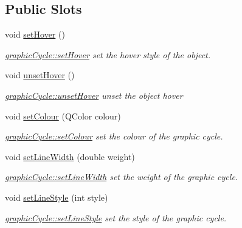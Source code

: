 \subsection*{Public Slots}
\begin{DoxyCompactItemize}
\item 
void \mbox{\hyperlink{classgraphic_cycle_a54708026fc7ea647f431263990872cdf}{set\+Hover}} ()
\begin{DoxyCompactList}\small\item\em \mbox{\hyperlink{classgraphic_cycle_a54708026fc7ea647f431263990872cdf}{graphic\+Cycle\+::set\+Hover}} set the hover style of the object. \end{DoxyCompactList}\item 
void \mbox{\hyperlink{classgraphic_cycle_a7d9d805ccc83dcf16623c969ad48b6a5}{unset\+Hover}} ()
\begin{DoxyCompactList}\small\item\em \mbox{\hyperlink{classgraphic_cycle_a7d9d805ccc83dcf16623c969ad48b6a5}{graphic\+Cycle\+::unset\+Hover}} unset the object hover \end{DoxyCompactList}\item 
void \mbox{\hyperlink{classgraphic_cycle_a48965c220e8fad0181f1f793c17fb73c}{set\+Colour}} (Q\+Color colour)
\begin{DoxyCompactList}\small\item\em \mbox{\hyperlink{classgraphic_cycle_a48965c220e8fad0181f1f793c17fb73c}{graphic\+Cycle\+::set\+Colour}} set the colour of the graphic cycle. \end{DoxyCompactList}\item 
void \mbox{\hyperlink{classgraphic_cycle_aa02ce6a22ddb0ae859ab6dac49a0570a}{set\+Line\+Width}} (double weight)
\begin{DoxyCompactList}\small\item\em \mbox{\hyperlink{classgraphic_cycle_aa02ce6a22ddb0ae859ab6dac49a0570a}{graphic\+Cycle\+::set\+Line\+Width}} set the weight of the graphic cycle. \end{DoxyCompactList}\item 
void \mbox{\hyperlink{classgraphic_cycle_a96f1a1d6c958bfba3789a13c156f9795}{set\+Line\+Style}} (int style)
\begin{DoxyCompactList}\small\item\em \mbox{\hyperlink{classgraphic_cycle_a96f1a1d6c958bfba3789a13c156f9795}{graphic\+Cycle\+::set\+Line\+Style}} set the style of the graphic cycle. \end{DoxyCompactList}\item 

\end{DoxyCompactItemize}

